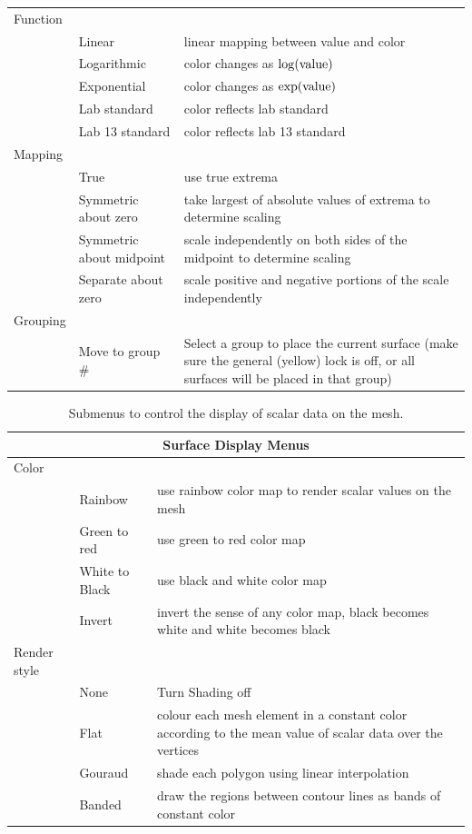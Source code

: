 \begin{table}[ht]
\begin{center}
\begin{tabular}{|l|l|p{3 in}|}
    Function & & \\
    &  Linear & linear mapping between value and color \\ 
    &  Logarithmic & color changes as  $\log({\rm value})$ \\ 
    &  Exponential & color changes as  $\exp({\rm value})$ \\ 
    &  Lab standard & color reflects lab standard \\ 
    &  Lab 13 standard & color reflects lab 13 standard \\ \hline
    Mapping & & \\ 
    &  True & use true extrema \\ 
    &  Symmetric about zero & take largest of absolute values of extrema to
    determine scaling \\
    &  Symmetric about midpoint & scale independently on both sides of the
    midpoint to determine scaling \\
    &  Separate about zero & scale positive and negative portions of the
    scale independently \\ \hline
    Grouping & & \\
    &  Move to group \# & Select a group to place the current surface
    (make sure the general (yellow) lock is off, or all surfaces
    will be placed in that group) \\ \hline
    \end{tabular}
  \end{center}
\end{table}

\begin{table}[ht]
    \caption{Submenus to control the display of scalar data on the mesh.}
  \begin{center}
    \begin{tabular}{|l|l|p{2.5 in}|} \hline
      \multicolumn{3}{|c|}{\textbf{Surface Display Menus}} \\ \hline \hline
    Color & & \\
    &  Rainbow  & use rainbow color map to render scalar values on the mesh\\
    &  Green to red & use green to red color map\\
    &  White to Black & use black and white color map\\ 
    &  Invert & invert the sense of any color map, \eg{} black becomes
        white and white becomes black \\ \hline
    Render style & & \\
    &  None & Turn Shading off \\
    &  Flat & colour each mesh element in a constant
       color according to the mean value of scalar data over the vertices\\
    &  Gouraud & shade each polygon using linear interpolation \\
    &  Banded & draw the regions between contour lines as bands of constant
       color\\  \hline
    \end{tabular}
  \end{center}
\end{table}

